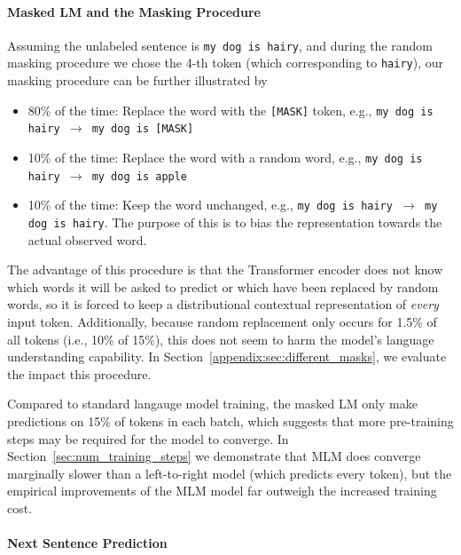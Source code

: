 \paragraph{Masked LM and the Masking Procedure} 

Assuming the unlabeled sentence is {\tt {\small my dog is hairy}}, 
and during the random masking procedure we chose the 4-th token (which corresponding to {\tt {\small hairy}}), our masking procedure
can be further illustrated by
\begin{itemize}
\item 80\% of the time: Replace the word with the {\tt [MASK]} token, e.g., {\tt {\small my dog is hairy $\rightarrow$ my dog is [MASK]}}
\item 10\% of the time: Replace the word with a random word, e.g., {\tt {\small my dog is hairy $\rightarrow$ my dog is apple}}
\item 10\% of the time: Keep the word unchanged, e.g., {\tt {\small my dog is hairy $\rightarrow$ my dog is hairy}}. The purpose of this is to bias the representation towards the actual observed word.
\end{itemize}

The advantage of this procedure is that the Transformer encoder does not know which words it will be asked to predict or which have been replaced by random words, so it is forced to keep a distributional contextual representation of {\it every} input token. Additionally, because random replacement only occurs for 1.5\% of all tokens (i.e., 10\% of 15\%), this does not seem to harm the model's language understanding capability. In Section~\ref{appendix:sec:different_masks},
we evaluate the impact this procedure.

Compared to standard langauge model training, the masked LM only
make predictions on 15\% of tokens in each batch, which suggests that more pre-training steps may be required for the model to converge. In Section~\ref{sec:num_training_steps} we demonstrate that MLM does converge marginally slower than a left-to-right model (which predicts every token), but the empirical improvements of the MLM model far outweigh the increased training cost.

\paragraph{Next Sentence Prediction} 

